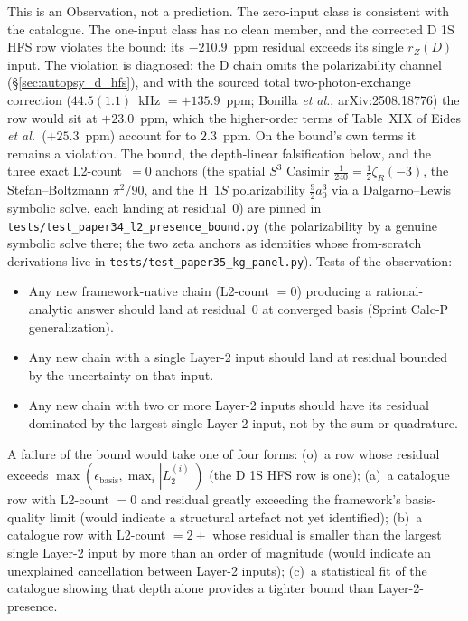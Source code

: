 \documentclass[11pt]{article}
\begin{document}
This is an Observation, not a prediction.  The zero-input class is
consistent with the catalogue.  The one-input class has no clean
member, and the corrected D 1S HFS row violates the bound: its
$-210.9$~ppm residual exceeds its single $r_Z(D)$ input.  The violation
is diagnosed: the D chain omits the polarizability channel
(\S\ref{sec:autopsy_d_hfs}), and with the sourced total two-photon-exchange
correction ($44.5(1.1)$~kHz $= +135.9$~ppm; Bonilla \emph{et al.},
arXiv:2508.18776) the row would sit at $+23.0$~ppm, which the
higher-order terms of Table~XIX of Eides \emph{et al.}\ ($+25.3$~ppm)
account for to $2.3$~ppm.  On the bound's own terms it remains a
violation.  The bound,
the depth-linear falsification below, and the
three exact L2-count~$=0$ anchors (the spatial $S^3$ Casimir
$\tfrac{1}{240} = \tfrac12\zeta_R(-3)$, the Stefan--Boltzmann
$\pi^2/90$, and the H~$1S$ polarizability $\tfrac{9}{2}a_0^3$ via a
Dalgarno--Lewis symbolic solve, each landing at residual~$0$) are
pinned in
\texttt{tests/test\_paper34\_l2\_presence\_bound.py} (the polarizability
by a genuine symbolic solve there; the two zeta anchors as identities
whose from-scratch derivations live in
\texttt{tests/test\_paper35\_kg\_panel.py}).  Tests of the
observation:
\begin{itemize}\setlength\itemsep{0pt}
\item Any new framework-native chain (L2-count $= 0$) producing a
rational-analytic answer should land at residual~$0$ at converged
basis (Sprint Calc-P generalization).
\item Any new chain with a single Layer-2 input should land at
residual bounded by the uncertainty on that input.
\item Any new chain with two or more Layer-2 inputs should have
its residual dominated by the largest single Layer-2 input,
not by the sum or quadrature.
\end{itemize}
A failure of the bound would take one of four forms:
(o)~a row whose residual exceeds
$\max(\epsilon_\text{basis}, \max_i|L_2^{(i)}|)$ (the D 1S HFS row is
one); (a)~a catalogue row with L2-count $= 0$ and residual greatly
exceeding the framework's basis-quality limit (would indicate a
structural artefact not yet identified); (b)~a catalogue row with
L2-count $= 2+$ whose residual is smaller than the largest
single Layer-2 input by more than an order of magnitude (would
indicate an unexplained cancellation between Layer-2 inputs);
(c)~a statistical fit of the catalogue showing that depth alone
provides a tighter bound than Layer-2-presence.
\end{document}
